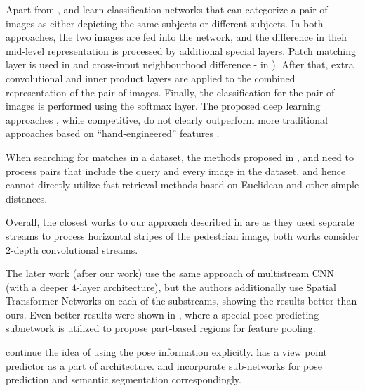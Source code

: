 Apart from \citep{yi2014deep}, \citep{Li14} and \citep{ahmed2015improved} learn classification networks that can categorize a pair of images as either depicting  the same subjects or different subjects. In both approaches, the two images are fed into the network, and the difference in their mid-level representation is processed by additional special layers. Patch matching layer is used in \citep{Li14} and cross-input neighbourhood difference - in \citep{ahmed2015improved}). After that, extra convolutional and inner product layers are applied to the combined representation of the pair of images. Finally, the classification for the pair of images is performed using the softmax layer. The proposed deep learning approaches \citep{ahmed2015improved, yi2014deep, Li14}, while competitive, do not clearly outperform more traditional approaches based on ``hand-engineered'' features \citep{paisitkriangkrai2015learning, zhao2014person}.

When searching for matches in a dataset, the methods proposed in \citep{Li14}, \citep{ahmed2015improved} and \citep{chen2016deep} need to process pairs that include the query and every image in the dataset, and hence cannot directly utilize fast retrieval methods based on Euclidean and other simple distances. %

Overall, the closest works to our approach described in  are \citep{Yi14,cheng2016person} as they used separate streams to process horizontal stripes of the pedestrian image, both works consider $2$-depth convolutional streams.

The later work \citep{li2017learning} (after our work) use the same approach of multistream CNN (with a deeper $4$-layer architecture), but the authors additionally use Spatial Transformer Networks on each of the substreams, showing the results better than ours. Even better results were shown in \citep{zhao2017spindle}, where a special pose-predicting subnetwork is utilized to propose part-based regions for feature pooling.

\citep{saquib2018pose, suh2018part, kalayeh2018human} continue the idea of using the pose information explicitly. \citep{li2017learning} has a view point predictor as a part of architecture. \citep{suh2018part} and \citep{kalayeh2018human} incorporate sub-networks for pose prediction and semantic segmentation correspondingly.

